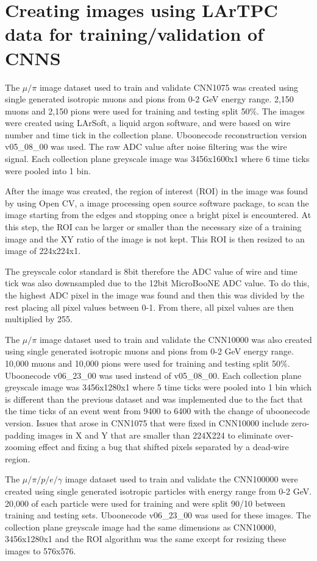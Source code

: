 \section{Creating images using LArTPC data for training/validation of CNNS}\label{image_making}
The $\mu/\pi$ image dataset used to train and validate CNN1075 was created using single generated isotropic muons and pions from 0-2 GeV energy range. 2,150 muons and 2,150 pions were used for training and testing split 50\%. The images were created using LArSoft, a liquid argon software, and were based on wire number and time tick in the collection plane. Uboonecode reconstruction version v05{\_}08{\_}00 was used. The raw ADC value after noise filtering was the wire signal. Each collection plane greyscale image was 3456x1600x1 where 6 time ticks were pooled into 1 bin. 

After the image was created, the region of interest (ROI) in the image was found by using Open CV, a image processing open source software package, to scan the image starting from the edges and stopping once a bright pixel is encountered. At this step, the ROI can be larger or smaller than the necessary size of a training image and the XY ratio of the image is not kept. This ROI is then resized to an image of 224x224x1. 

The greyscale color standard is 8bit therefore the ADC value of wire and time tick was also downsampled due to the 12bit MicroBooNE ADC value. To do this, the highest ADC pixel in the image was found and then this was divided by the rest placing all pixel values between 0-1. From there, all pixel values are then multiplied by 255.

The $\mu/\pi$ image dataset used to train and validate the CNN10000 was also created using single generated isotropic muons and pions from 0-2 GeV energy range. 10,000 muons and 10,000 pions were used for training and testing split 50\%. Uboonecode v06{\_}23{\_}00 was used instead of v05{\_}08{\_}00. Each collection plane greyscale image was 3456x1280x1 where 5 time ticks were pooled into 1 bin which is different than the previous dataset and was implemented due to the fact that the time ticks of an event went from 9400 to 6400 with the change of uboonecode version. Issues that arose in CNN1075 that were fixed in CNN10000 include zero-padding images in X and Y that are smaller than 224X224 to eliminate over-zooming effect and fixing a bug that shifted pixels separated by a dead-wire region.

The $\mu/\pi/p/e/\gamma$ image dataset used to train and validate the CNN100000 were created using single generated isotropic particles with energy range from 0-2 GeV. 20,000 of each particle were used for training and were split 90/10 between training and testing sets. Uboonecode v06{\_}23{\_}00 was used for these images. The collection plane greyscale image had the same dimensions as CNN10000, 3456x1280x1 and the ROI algorithm was the same except for resizing these images to 576x576. 

